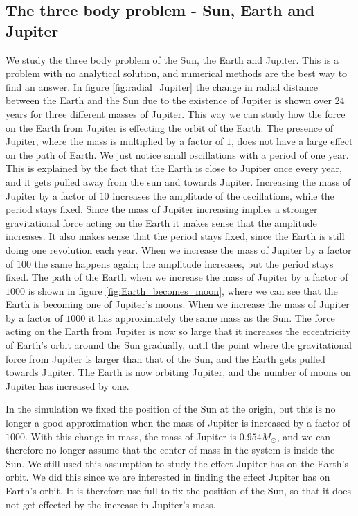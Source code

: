\documentclass[%
 reprint,
nofootinbib,
aps,
]{revtex4-1}
\begin{document}
\subsection{The three body problem - Sun, Earth and Jupiter}
We study the three body problem of the Sun, the Earth and Jupiter. This is a problem with no analytical solution, and numerical methods are the best way to find an answer. In figure \vref{fig:radial_Jupiter} the change in radial distance between the Earth and the Sun due to the existence of Jupiter is shown over $24$ years for three different masses of Jupiter. This way we can study how the force on the Earth from Jupiter is effecting the orbit of the Earth. The presence of Jupiter, where the mass is multiplied by a factor of $1$, does not have a large effect on the path of Earth. We just notice small oscillations with a period of one year. This is explained by the fact that the Earth is close to Jupiter once every year, and it gets pulled away from the sun and towards Jupiter. Increasing the mass of Jupiter by a factor of $10$ increases the amplitude of the oscillations, while the period stays fixed. Since the mass of Jupiter increasing implies a stronger gravitational force acting on the Earth it makes sense that the amplitude increases. It also makes sense that the period stays fixed, since the Earth is still doing one revolution each year. When we increase the mass of Jupiter by a factor of $100$ the same happens again; the amplitude increases, but the period stays fixed.
The path of the Earth when we increase the mass of Jupiter by a factor of $1000$ is shown in figure \vref{fig:Earth_becomes_moon}, where we can see that the Earth is becoming one of Jupiter's moons. When we increase the mass of Jupiter by a factor of $1000$ it has approximately the same mass as the Sun. The force acting on the Earth from Jupiter is now so large that it increases the eccentricity of Earth's orbit around the Sun gradually, until the point where the gravitational force from Jupiter is larger than that of the Sun, and the Earth gets pulled towards Jupiter. The Earth is now orbiting Jupiter, and the number of moons on Jupiter has increased by one.
\par
In the simulation we fixed the position of the Sun at the origin, but this is no longer a good approximation when the mass of Jupiter is increased by a factor of $1000$. With this change in mass, the mass of Jupiter is $0.954M_\odot$, and we can therefore no longer assume that the center of mass in the system is inside the Sun. We still used this assumption to study the effect Jupiter has on the Earth's orbit. We did this since we are interested in finding the effect Jupiter has on Earth's orbit. It is therefore use full to fix the position of the Sun, so that it does not get effected by the increase in Jupiter's mass.\par
\end{document}
